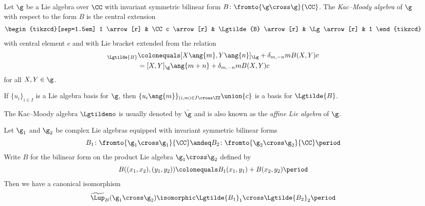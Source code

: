 \begin{definition}
	Let $ \g $ be a Lie algebra over $ \CC $ with invariant symmetric bilinear form $ B \colon \fromto{\g \cross \g}{\CC} $.
	The \textit{Kac--Moody algebra} of $ \g $ with respect to the form $ B $ is the central extension
	\begin{equation*}
		\begin{tikzcd}[sep=1.5em]
			1 \arrow[r] & \CC c \arrow[r] & \Lgtilde{B} \arrow[r] & \Lg \arrow[r] & 1
		\end{tikzcd}
	\end{equation*}
	with central element $ c $ and with Lie bracket extended from the relation
	\begin{align*}
		[X\ang{m},Y\ang{n}]_{\Lgtilde{B}} &\colonequals [X\ang{m},Y\ang{n}]_{\Lg} + \delta_{m,-n} m B(X,Y) c \\ 
		&= [X,Y]_{\g}\ang{m+n} + \delta_{m,-n} m B(X,Y) c
	\end{align*} 
	for all $ X,Y \in \g $.
\end{definition}

\begin{nul}
	If $ \{u_i\}_{i \in I} $ is a Lie algebra basis for $ \g $, then $ \{u_i\ang{m} \}_{(i,m) \in I \cross \ZZ} \union \{c\} $ is a basis for $ \Lgtilde{B} $.
\end{nul}

\begin{remark}
	The Kac--Moody algebra $ \Lgtildeno $ is usually denoted by $ \hat{\g} $ and is also known as the
	\textit{affine Lie algebra} of $ \g $.
\end{remark}

\begin{remark}\label{remark:prodKacMoodyalg}
	Let $ \g_1 $ and $ \g_2 $ be complex Lie algebras equipped with invariant symmetric bilinear forms
	\begin{equation*}
		B_1 \colon \fromto{\g_1 \cross \g_1}{\CC} \andeq B_2 \colon \fromto{\g_2 \cross \g_2}{\CC} \period
	\end{equation*}
	Write $ B $ for the bilinear form on the product Lie algebra $ \g_1 \cross \g_2 $ defined by
	\begin{equation*}
		B((x_1,x_2),(y_1,y_2)) \colonequals B_1(x_1,y_1) + B(x_2,y_2) \period
	\end{equation*}
	Then we have a canonical isomorphism
	\begin{equation*}
		\widetilde{\Lup}_{B}(\g_1 \cross \g_2) \isomorphic \Lgtilde{B_1}_1 \cross \Lgtilde{B_2}_2 \period
	\end{equation*}
\end{remark}

